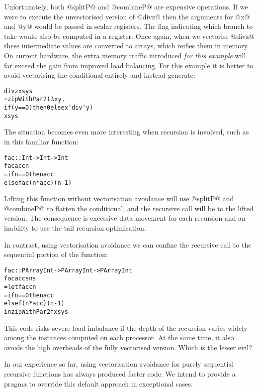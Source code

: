 Unfortunately, both @splitP@ and @combineP@ are expensive operations. If we were to execute the unvectorised version of @divz@ then the arguments for @x@ and @y@ would be passed in scalar registers. The flag indicating which branch to take would also be computed in a register. Once again, when we vectorise @divz@ these intermediate values are converted to arrays, which reifies them in memory. On current hardware, the extra memory traffic introduced \emph{for this example} will far exceed the gain from improved load balancing. For this example it is better to avoid vectorising the conditional entirely and instead generate:
%
\begin{small}
\begin{alltt}
  divz xs ys 
   = zipWithPar2 (\(\lambda\)x y.
       if (y == 0) then 0 else x `div` y) 
       xs ys
\end{alltt}
\end{small}
%
The situation becomes even more interesting when recursion is involved, such as in this familiar function:
%
\begin{small}
\begin{alltt}
  fac :: Int -> Int -> Int
  fac acc n 
   = if n == 0 then acc
               else fac (n * acc) (n - 1)
\end{alltt}
\end{small}
%
Lifting this function without vectorisation avoidance will use @splitP@ and @combineP@ to flatten the conditional, and the recursive call will be to the lifted version. The consequence is excessive data movement for each recursion and an inability to use the tail recursion optimisation.

In contrast, using vectorisation avoidance we can confine the recursive call to the sequential portion of the function:
%
\begin{small}
\begin{alltt}
  fac :: PArray Int -> PArray Int -> PArray Int
  fac accs ns
   = let f acc n 
          = if n == 0 then acc
                       else f (n * acc) (n - 1)
     in  zipWithPar2 f xs ys
\end{alltt}
\end{small}
%
This code risks severe load imbalance if the depth of the recursion varies widely among the instances computed on each processor. At the same time, it also avoids the high overheads of the fully vectorised version. Which is the lesser evil?

In our experience so far, using vectorisation avoidance for purely sequential recursive functions has always produced faster code. We intend to provide a pragma to override this default approach in exceptional cases.


